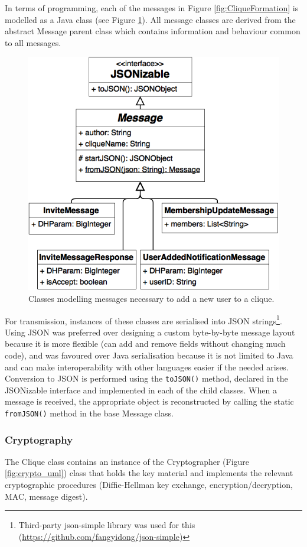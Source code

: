 \documentclass[a4paper, 12pt]{report}
\begin{document}
In terms of programming, each of the messages in Figure \ref{fig:CliqueFormation} is modelled as a Java class (see Figure \ref{fig:messages_uml}). All message classes are derived from the abstract Message parent class which contains information and behaviour common to all messages.

\begin{figure}[H]
    \centering
    \includegraphics[width=0.6\linewidth]{pics/messages_uml.png}
    \caption{\label{fig:messages_uml} Classes modelling messages necessary to add a new user to a clique.}
\end{figure}

For transmission, instances of these classes are serialised into JSON strings\footnote{Third-party json-simple library was used for this (\url{https://github.com/fangyidong/json-simple})}. Using JSON was preferred over designing a custom byte-by-byte message layout because it is more flexible (can add and remove fields without changing much code), and was favoured over Java serialisation because it is not limited to Java and can make interoperability with other languages easier if the needed arises. Conversion to JSON is performed using the \texttt{toJSON()} method, declared in the JSONizable interface and implemented in each of the child classes. When a message is received, the appropriate object is reconstructed by calling the static \texttt{fromJSON()} method in the base Message class. \\

\subsubsection{Cryptography}
The Clique class contains an instance of the Cryptographer (Figure \ref{fig:crypto_uml}) class that holds the key material and implements the relevant cryptographic procedures (Diffie-Hellman key exchange, encryption/decryption, MAC, message digest).
\end{document}
